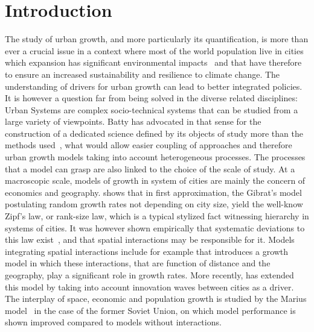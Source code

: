 \documentclass[10pt,letterpaper]{article}
\begin{document}
\linenumbers

\justify


\section*{Introduction}


The study of urban growth, and more particularly its quantification, is more than ever a crucial issue in a context where most of the world population live in cities which expansion has significant environmental impacts~\cite{seto2012global} and that have therefore to ensure an increased sustainability and resilience to climate change. The understanding of drivers for urban growth can lead to better integrated policies. It is however a question far from being solved in the diverse related disciplines: Urban Systems are complex socio-technical systems that can be studied from a large variety of viewpoints. Batty has advocated in that sense for the construction of a dedicated science defined by its objects of study more than the methods used~\cite{batty2013new}, what would allow easier coupling of approaches and therefore urban growth models taking into account heterogeneous processes. The processes that a model can grasp are also linked to the choice of the scale of study. At a macroscopic scale, models of growth in system of cities are mainly the concern of economics and geography. \cite{gabaix1999zipf} shows that in first approximation, the Gibrat's model postulating random growth rates not depending on city size, yield the well-know Zipf's law, or rank-size law, which is a typical stylized fact witnessing hierarchy in systems of cities. It was however shown empirically that systematic deviations to this law exist~\cite{rozenfeld2008laws}, and that spatial interactions may be responsible for it. Models integrating spatial interactions include for example \cite{bretagnolle2000long} that introduces a growth model in which these interactions, that are function of distance and the geography, play a significant role in growth rates. More recently, \cite{favaro2011gibrat} has extended this model by taking into account innovation waves between cities as a driver. The interplay of space, economic and population growth is studied by the Marius model~\cite{cottineau2014evolution} in the case of the former Soviet Union, on which model performance is shown improved compared to models without interactions.
\end{document}
